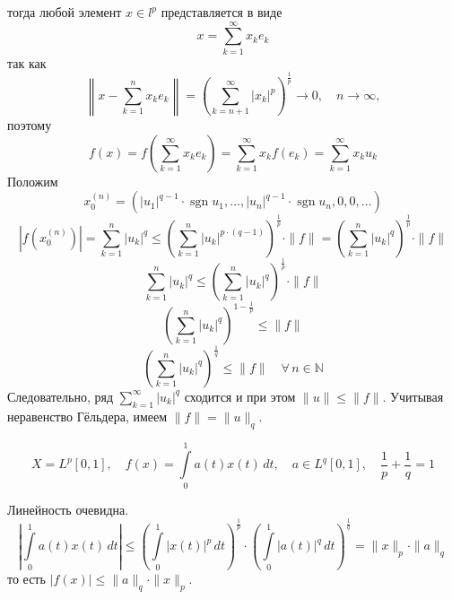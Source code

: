 \documentclass[12pt]{article}
\newtheorem{example}{\hskip\parindent Пример}%
\begin{document}
тогда любой элемент $x\in l^p$ представляется в виде
\begin{equation*}
x=\sum\limits_{k=1}^{\infty}x_ke_k
\end{equation*}
так как
\begin{equation*}
\left\|x-\sum\limits_{k=1}^{n}x_ke_k\right\|=\left(\sum\limits_{k=n+1}^{\infty}|x_k|^p\right)^{\frac{1}{p}}\to0, \quad n\to\infty,
\end{equation*}
поэтому
\begin{equation*}
f(x)=f\left(\sum\limits_{k=1}^{\infty}x_ke_k\right)=\sum\limits_{k=1}^{\infty}x_kf(e_k)=\sum\limits_{k=1}^{\infty}x_ku_k
\end{equation*}
Положим 
\begin{equation*}
x_0^{(n)}=\left(|u_1|^{q-1}\cdot\operatorname{sgn}u_1,\dots,|u_n|^{q-1}\cdot\operatorname{sgn}u_n,0,0,\dots\right)
\end{equation*}
\begin{equation*}
\left|f(x_0^{(n)})\right|=\sum\limits_{k=1}^{n}|u_k|^q\leqslant\left(\sum\limits_{k=1}^{n}|u_k|^{p\cdot(q-1)}\right)^{\frac{1}{p}}\cdot\|f\|=\left(\sum\limits_{k=1}^{n}|u_k|^{q}\right)^{\frac{1}{p}}\cdot\|f\|
\end{equation*}
\begin{equation*}
	\sum\limits_{k=1}^{n}|u_k|^q\leqslant\left(\sum\limits_{k=1}^{n}|u_k|^{q}\right)^{\frac{1}{p}}\cdot\|f\|
\end{equation*}
\begin{equation*}
	\left(\sum\limits_{k=1}^{n}|u_k|^{q}\right)^{1-\frac{1}{p}}\leqslant\|f\|
\end{equation*}
\begin{equation*}
	\left(\sum\limits_{k=1}^{n}|u_k|^{q}\right)^{\frac{1}{q}}\leqslant\|f\| \quad \forall\, n\in\mathbb{N}
\end{equation*}
Следовательно, ряд $\sum\limits_{k=1}^{\infty}|u_k|^{q}$ сходится и при этом $\|u\|\leqslant\|f\|$. Учитывая неравенство Гёльдера, имеем $\|f\|=\|u\|_q$.
\begin{example}
	\begin{equation*}
		X=L^p[0,1], \quad f(x)=\int\limits_{0}^{1}a(t)x(t)\,dt, \quad a\in L^q[0,1], \quad \frac{1}{p}+\frac{1}{q}=1
	\end{equation*}
\end{example}
Линейность очевидна.
\begin{equation*}
	\left|\int\limits_{0}^{1}a(t)x(t)\,dt\right|\leqslant\left(\int\limits_{0}^{1}|x(t)|^p\,dt\right)^{\frac{1}{p}}\cdot\left(\int\limits_{0}^{1}|a(t)|^q\,dt\right)^{\frac{1}{q}}=\|x\|_p\cdot\|a\|_q
\end{equation*}
то есть $|f(x)|\leqslant \|a\|_q\cdot \|x\|_p$.
\end{document}
